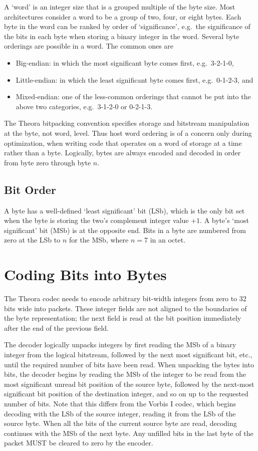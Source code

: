 \documentclass[11pt,letterpaper]{book}
\numberwithin{equation}{chapter}
\numberwithin{figure}{chapter}
\numberwithin{table}{chapter}
\begin{document}
A `word' is an integer size that is a grouped multiple of the byte size.
Most architectures consider a word to be a group of two, four, or eight bytes.
Each byte in the word can be ranked by order of `significance', e.g.\ the
 significance of the bits in each byte when storing a binary integer in the
 word.
Several byte orderings are possible in a word.
The common ones are
\begin{itemize}
\item{Big-endian:}
in which the most significant byte comes first, e.g.\ 3-2-1-0,
\item{Little-endian:}
in which the least significant byte comes first, e.g.\ 0-1-2-3, and
\item{Mixed-endian:}
one of the less-common orderings that cannot be put into the above two
 categories, e.g.\ 3-1-2-0 or 0-2-1-3.
\end{itemize}

The Theora bitpacking convention specifies storage and bitstream manipulation
 at the byte, not word, level.
Thus host word ordering is of a concern only during optimization, when writing
 code that operates on a word of storage at a time rather than a byte.
Logically, bytes are always encoded and decoded in order from byte zero through
 byte $n$.

\subsection{Bit Order}

A byte has a well-defined `least significant' bit (LSb), which is the only bit
 set when the byte is storing the two's complement integer value $+1$.
A byte's `most significant' bit (MSb) is at the opposite end.
Bits in a byte are numbered from zero at the LSb to $n$ for the MSb, where
 $n=7$ in an octet.

\section{Coding Bits into Bytes}

The Theora codec needs to encode arbitrary bit-width integers from zero to 32
 bits wide into packets.
These integer fields are not aligned to the boundaries of the byte
 representation; the next field is read at the bit position immediately
 after the end of the previous field.

The decoder logically unpacks integers by first reading the MSb of a binary
 integer from the logical bitstream, followed by the next most significant
 bit, etc., until the required number of bits have been read.
When unpacking the bytes into bits, the decoder begins by reading the MSb of
 the integer to be read from the most significant unread bit position of the
 source byte, followed by the next-most significant bit position of the
 destination integer, and so on up to the requested number of bits.
Note that this differs from the Vorbis I codec, which
 begins decoding with the LSb of the source integer, reading it from the
 LSb of the source byte.
When all the bits of the current source byte are read, decoding continues with
 the MSb of the next byte.
Any unfilled bits in the last byte of the packet MUST be cleared to zero by the
 encoder.
\end{document}
